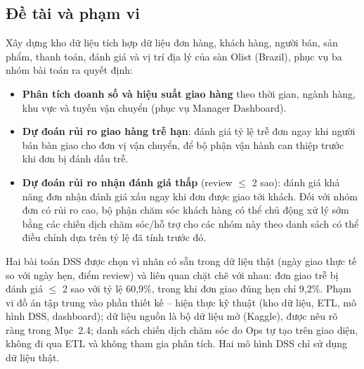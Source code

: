 \subsection{Đề tài và phạm vi}
\hspace{1cm}
Xây dựng kho dữ liệu tích hợp dữ liệu đơn hàng, khách hàng, người bán, sản
phẩm, thanh toán, đánh giá và vị trí địa lý của sàn Olist (Brazil), phục vụ ba nhóm bài toán
ra quyết định:
\begin{itemize}
    \item \textbf{Phân tích doanh số và hiệu suất giao hàng} theo thời gian, ngành hàng, khu
          vực và tuyến vận chuyển (phục vụ Manager Dashboard).
    \item \textbf{Dự đoán rủi ro giao hàng trễ hạn}: đánh giá tỷ lệ trễ đơn ngay khi người bán bàn giao
          cho đơn vị vận chuyển, để bộ phận vận hành can thiệp trước khi đơn bị đánh dấu trễ.
    \item \textbf{Dự đoán rủi ro nhận đánh giá thấp} (review $\leq$ 2 sao): đánh giá khả năng đơn nhận đánh giá xấu ngay khi đơn được
          giao tới khách. Đối với nhóm đơn có rủi ro cao, bộ phận chăm sóc khách hàng có thể chủ động xử lý sớm bằng các chiến dịch chăm sóc/hỗ trợ 
          cho các nhóm này theo danh sách có thể điều chỉnh dựa trên tỷ lệ đã tính trước đó.
\end{itemize}
Hai bài toán DSS được chọn vì nhãn có sẵn trong dữ liệu thật (ngày giao thực tế so với ngày
hẹn, điểm review) và liên quan chặt chẽ với nhau: đơn giao trễ bị đánh giá $\leq$ 2 sao với tỷ
lệ 60,9\%, trong khi đơn giao đúng hẹn chỉ 9,2\%.
Phạm vi đồ án tập trung vào phần thiết kế -- hiện thực kỹ thuật (kho dữ liệu, ETL, mô hình
DSS, dashboard); dữ liệu nguồn là bộ dữ liệu mở (Kaggle), được nêu rõ ràng trong Mục~2.4;
danh sách chiến dịch chăm sóc do Ops tự tạo trên giao diện, không đi qua ETL và không tham gia phân tích. Hai mô hình DSS chỉ sử dụng dữ liệu thật.


